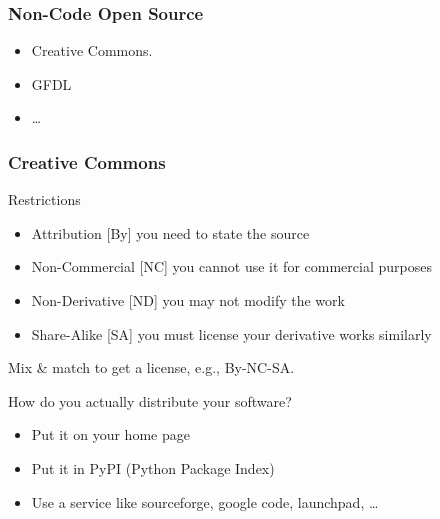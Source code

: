 \begin{frame}[fragile]
\frametitle{Non-Code Open Source}

\begin{itemize}
\item Creative Commons.
\item GFDL
\item \ldots
\end{itemize}
\end{frame}

\begin{frame}[fragile]
\frametitle{Creative Commons}

\begin{block}{Restrictions}
\begin{itemize}
\item \alert{Attribution} [By] you need to state the source
\item \alert{Non-Commercial} [NC] you cannot use it for commercial purposes
\item \alert{Non-Derivative} [ND] you may not modify the work
\item \alert{Share-Alike} [SA] you must license your derivative works similarly 
\end{itemize}
\end{block}

Mix \& match to get a license, e.g., By-NC-SA.
\end{frame}

\begin{frame}[fragile]
{}
How do you actually distribute your software?

\begin{itemize}
\item Put it on your home page
\item Put it in PyPI (Python Package Index)
\item Use a service like \alert{sourceforge}, \alert{google code}, \alert{launchpad}, \ldots
\end{itemize}
\end{frame}

